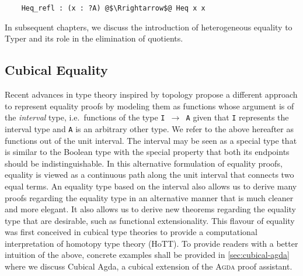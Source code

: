 \documentclass[12pt,twoside,maitrise]{dms}
\theoremstyle{definition}
\numberwithin{equation}{section}
\numberwithin{table}{chapter}
\numberwithin{figure}{chapter}
\newcommand\id[1] {\texttt{#1}}
\newcommand\fn[1] {\texttt{#1}}
\def\Agda{\textsc{Agda}\xspace}
\begin{document}
\begin{verbatim}
    Heq_refl : (x : ?A) @$\Rrightarrow$@ Heq x x
\end{verbatim}

In subsequent chapters, we discuss the introduction of heterogeneous equality to
Typer and its role in the elimination of quotients.


\subsection*{Cubical Equality}

Recent advances in type theory inspired by topology propose a different approach
to represent equality proofs by modeling them as functions whose argument is of
the \emph{interval} type, i.e.\ functions of the type \fn{I $\rightarrow$ A}
given that \id{I} represents the interval type and \id{A} is an arbitrary other
type. We refer to the above hereafter as functions out of the unit interval. The
interval may be seen as a special type that is similar to the Boolean type with
the special property that both its endpoints should be indistinguishable. In
this alternative formulation of equality proofs, equality is viewed as a
continuous path along the unit interval that connects two equal terms.
An equality type based on the interval also allows us to derive many proofs
regarding the equality type in an alternative manner that is much cleaner and
more elegant. It also allows us to derive new theorems regarding the equality
type that are desirable, such as functional extensionality. This flavour of
equality was first conceived in cubical type theories\cite{bezem2014model} to
provide a computational interpretation of homotopy type theory
(HoTT)\cite{HoTTbook}. To provide readers with a better intuition of the above,
concrete examples shall be provided in \autoref{sec:cubical-agda} where we
discuss Cubical Agda\cite{vezzosi2021cubical}, a cubical extension of the
\Agda{} proof assistant.
\end{document}
